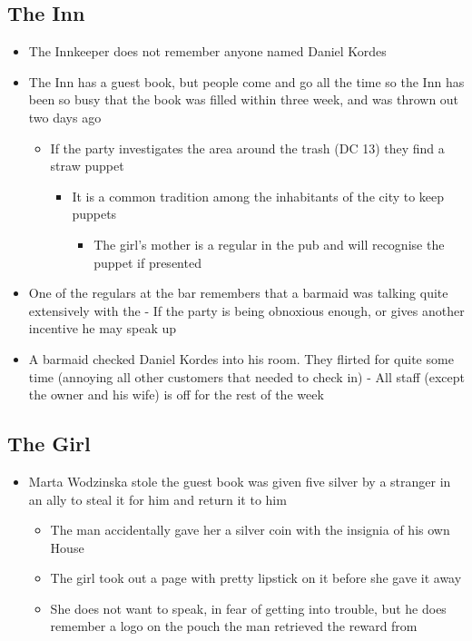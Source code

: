 \subsection*{The Inn}
\begin{itemize}
    \item The Innkeeper does not remember anyone named Daniel Kordes
    \item The Inn has a guest book, but people come and go all the time so the Inn has been so busy that the book was filled within three week, and was thrown out two days ago
    \begin{itemize}
        \item If the party investigates the area around the trash (DC 13) they find a straw puppet
        \begin{itemize}
            \item It is a common tradition among the inhabitants of the city to keep puppets
            \begin{itemize}
                \item The girl's mother is a regular in the pub and will recognise the puppet if presented
            \end{itemize}
        \end{itemize}
    \end{itemize}
    \item One of the regulars at the bar remembers that a barmaid was talking quite extensively with the - If the party is being obnoxious enough, or gives another incentive he may speak up
    \item A barmaid checked Daniel Kordes into his room. They flirted for quite some time (annoying all other customers that needed to check in) - All staff (except the owner and his wife) is off for the rest of the week
\end{itemize}

\subsection*{The Girl}
\begin{itemize}
    \item Marta Wodzinska stole the guest book was given five silver by a stranger in an ally to steal it for him and return it to him
    \begin{itemize}
        \item The man accidentally gave her a silver coin with the insignia of his own House
        \item The girl took out a page with pretty lipstick on it before she gave it away
        \item She does not want to speak, in fear of getting into trouble, but he does remember a logo on the pouch the man retrieved the reward from
    \end{itemize}
\end{itemize}

